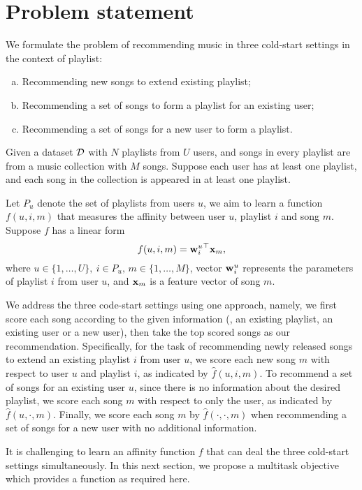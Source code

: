 \section{Problem statement}
\label{sec:problem}

We formulate the problem of recommending music in three cold-start settings in the context of playlist:
\begin{enumerate}[(a)]
\item Recommending new songs to extend existing playlist;
\item Recommending a set of songs to form a playlist for an existing user;
\item Recommending a set of songs for a new user to form a playlist.
\end{enumerate}

Given a dataset $\mathcal{D}$ with $N$ playlists from $U$ users, 
and songs in every playlist are from a music collection with $M$ songs.
Suppose each user has at least one playlist, and each song in the collection 
is appeared in at least one playlist.

Let $P_u$ denote the set of playlists from users $u$,
we aim to learn a function $f(u, i, m)$ that measures the affinity between user $u$, 
playlist $i$ and song $m$. Suppose $f$ has a linear form
\begin{equation}
\label{eq:scorefunc}
f(u, i, m) = {\mathbf{w}_i^u}^\top \mathbf{x}_m,
\end{equation}
where $u \in \{1,\dots,U\}, \ i \in P_u, \, m \in \{1,\dots,M\}$,
vector $\mathbf{w}_i^u$ represents the parameters of playlist $i$ from user $u$,
and $\mathbf{x}_m$ is a feature vector of song $m$.

We address the three code-start settings using one approach, namely, we first score each song 
according to the given information (\eg, an existing playlist, an existing user or a new user),
then take the top scored songs as our recommendation.
Specifically, for the task of recommending newly released songs to extend an existing playlist $i$ from user $u$,
we score each new song $m$ with respect to user $u$ and playlist $i$, as indicated by $\hat f(u, i, m)$.
To recommend a set of songs for an existing user $u$,
since there is no information about the desired playlist, we score each song $m$ with respect to only the user,
as indicated by $\hat f(u, \cdot, m)$.
Finally, we score each song $m$ by $\hat f(\cdot, \cdot, m)$ when recommending a set of songs 
for a new user with no additional information.

It is challenging to learn an affinity function $f$ that can deal the three cold-start settings simultaneously.
In this next section, we propose a multitask objective which provides a function as required here.
